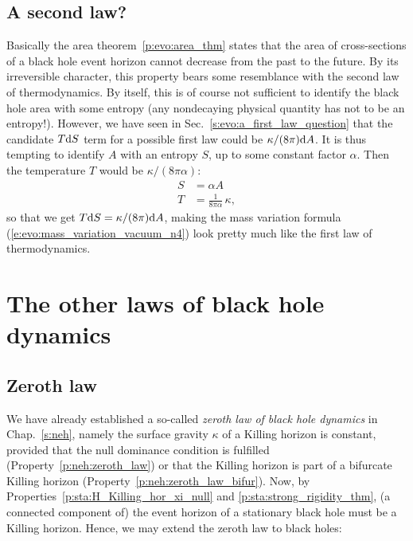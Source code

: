 \subsection{A second law?}

Basically the area theorem~\ref{p:evo:area_thm} states that
the area of cross-sections of a black hole event horizon
cannot decrease from the past to the future.
By its irreversible character, this property bears some resemblance
with the second law of thermodynamics.
By itself, this is of course not sufficient to identify the black hole area
with some entropy (any nondecaying physical quantity has not to be an entropy!).
However, we have seen in Sec.~\ref{s:evo:a_first_law_question} that the
candidate $T\mathrm{d} S$ term for a possible first law could be $\kappa/(8\pi)\mathrm{d} A$.
It is thus tempting to identify $A$ with an entropy $S$, up to some
constant factor $\alpha$. Then the temperature $T$ would be $\kappa/(8\pi\alpha)$:
\begin{subequations}
\label{e:evo:identif_S_T}
\begin{align}
  S & = \alpha A \label{e:evo:identif_S_A}\\
  T &= \frac{1}{8 \pi\alpha}\, \kappa , \label{e:evo:identif_T_kappa}
\end{align}
\end{subequations}
so that we get $T\mathrm{d} S = \kappa/(8\pi)\mathrm{d} A$, making
the mass variation formula (\ref{e:evo:mass_variation_vacuum_n4}) look pretty much like
the first law of thermodynamics.


\section{The other laws of black hole dynamics}

\subsection{Zeroth law}

We have already established a so-called \emph{zeroth law of black hole dynamics}
in Chap.~\ref{s:neh}, namely the surface gravity
$\kappa$ of a Killing horizon is constant, provided that the
null dominance condition is fulfilled (Property~\ref{p:neh:zeroth_law})
or that the Killing horizon is part of a bifurcate Killing horizon
(Property~\ref{p:neh:zeroth_law_bifur}).
Now, by Properties~\ref{p:sta:H_Killing_hor_xi_null}
and \ref{p:sta:strong_rigidity_thm}, (a connected component of) the event horizon
of a stationary black hole must be a Killing horizon. Hence, we may extend
the zeroth law to black holes:

